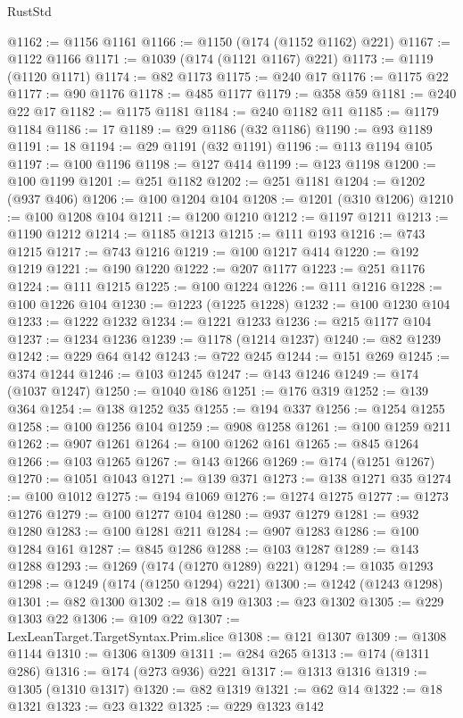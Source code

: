 \begin{lexlean}{RustStd}
\begin{coremodule}
@1162 := @1156 @1161
@1166 := @1150 (@174 (@1152 @1162) @221)
@1167 := @1122 @1166
@1171 := @1039 (@174 (@1121 @1167) @221)
@1173 := @1119 (@1120 @1171)
@1174 := @82 @1173
@1175 := @240 @17
@1176 := @1175 @22
@1177 := @90 @1176
@1178 := @485 @1177
@1179 := @358 @59
@1181 := @240 @22 @17
@1182 := @1175 @1181
@1184 := @240 @1182 @11
@1185 := @1179 @1184
@1186 := 17
@1189 := @29 @1186 (@32 @1186)
@1190 := @93 @1189
@1191 := 18
@1194 := @29 @1191 (@32 @1191)
@1196 := @113 @1194 @105
@1197 := @100 @1196
@1198 := @127 @414
@1199 := @123 @1198
@1200 := @100 @1199
@1201 := @251 @1182
@1202 := @251 @1181
@1204 := @1202 (@937 @406)
@1206 := @100 @1204 @104
@1208 := @1201 (@310 @1206)
@1210 := @100 @1208 @104
@1211 := @1200 @1210
@1212 := @1197 @1211
@1213 := @1190 @1212
@1214 := @1185 @1213
@1215 := @111 @193
@1216 := @743 @1215
@1217 := @743 @1216
@1219 := @100 @1217 @414
@1220 := @192 @1219
@1221 := @190 @1220
@1222 := @207 @1177
@1223 := @251 @1176
@1224 := @111 @1215
@1225 := @100 @1224
@1226 := @111 @1216
@1228 := @100 @1226 @104
@1230 := @1223 (@1225 @1228)
@1232 := @100 @1230 @104
@1233 := @1222 @1232
@1234 := @1221 @1233
@1236 := @215 @1177 @104
@1237 := @1234 @1236
@1239 := @1178 (@1214 @1237)
@1240 := @82 @1239
@1242 := @229 @64 @142
@1243 := @722 @245
@1244 := @151 @269
@1245 := @374 @1244
@1246 := @103 @1245
@1247 := @143 @1246
@1249 := @174 (@1037 @1247)
@1250 := @1040 @186
@1251 := @176 @319
@1252 := @139 @364
@1254 := @138 @1252 @35
@1255 := @194 @337
@1256 := @1254 @1255
@1258 := @100 @1256 @104
@1259 := @908 @1258
@1261 := @100 @1259 @211
@1262 := @907 @1261
@1264 := @100 @1262 @161
@1265 := @845 @1264
@1266 := @103 @1265
@1267 := @143 @1266
@1269 := @174 (@1251 @1267)
@1270 := @1051 @1043
@1271 := @139 @371
@1273 := @138 @1271 @35
@1274 := @100 @1012
@1275 := @194 @1069
@1276 := @1274 @1275
@1277 := @1273 @1276
@1279 := @100 @1277 @104
@1280 := @937 @1279
@1281 := @932 @1280
@1283 := @100 @1281 @211
@1284 := @907 @1283
@1286 := @100 @1284 @161
@1287 := @845 @1286
@1288 := @103 @1287
@1289 := @143 @1288
@1293 := @1269 (@174 (@1270 @1289) @221)
@1294 := @1035 @1293
@1298 := @1249 (@174 (@1250 @1294) @221)
@1300 := @1242 (@1243 @1298)
@1301 := @82 @1300
@1302 := @18 @19
@1303 := @23 @1302
@1305 := @229 @1303 @22
@1306 := @109 @22
@1307 := LexLeanTarget.TargetSyntax.Prim.slice
@1308 := @121 @1307
@1309 := @1308 @1144
@1310 := @1306 @1309
@1311 := @284 @265
@1313 := @174 (@1311 @286)
@1316 := @174 (@273 @936) @221
@1317 := @1313 @1316
@1319 := @1305 (@1310 @1317)
@1320 := @82 @1319
@1321 := @62 @14
@1322 := @18 @1321
@1323 := @23 @1322
@1325 := @229 @1323 @142

\end{coremodule}
\end{lexlean}
